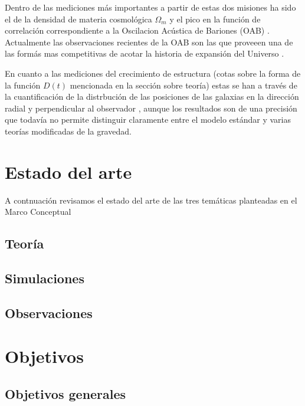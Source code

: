 \documentclass[spanish,notitlepage,letterpaper,11pt]{article} %
\begin{document}
Dentro de las mediciones m\'as importantes a partir de estas dos misiones
ha sido el de la densidad de materia cosmol\'ogica $\Omega_m$
\cite{2001Natur.410..169P} y el pico en la funci\'on de
correlaci\'on correspondiente a la Oscilacion Ac\'ustica de Bariones
(OAB) \cite{Eisenstein2005}. Actualmente las observaciones recientes de la OAB
son las que proveeen una de las form\'as mas competitivas de acotar la
historia de expansi\'on del Universo \cite{2014MNRAS.441...24A}.

En cuanto a las mediciones del crecimiento de estructura (cotas sobre
la forma de la funci\'on $D(t)$ mencionada en la secci\'on sobre
teor\'ia) estas se han a trav\'es de la cuantificaci\'on de la
distrbuci\'on de las posiciones de las galaxias en la direcci\'on
radial y perpendicular al observador \cite{2014MNRAS.439.3504S},
aunque los resultados son de una precisi\'on que todav\'ia no permite
distinguir claramente entre el modelo est\'andar y varias teor\'ias
modificadas de la gravedad.


\section{Estado del arte}

A contnuaci\'on revisamos el estado del arte de las tres tem\'aticas
planteadas en el Marco Conceptual


\subsection{Teor\'ia}

\subsection{Simulaciones}


\subsection{Observaciones}

\section{Objetivos}

\subsection*{Objetivos generales} 
\end{document}
